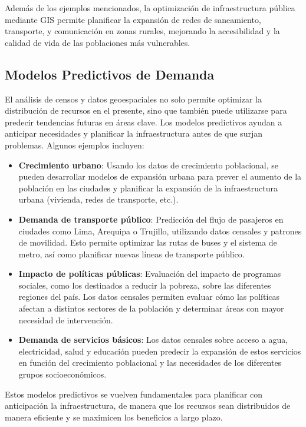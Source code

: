 \documentclass{article}
\begin{document}
{Además de los ejemplos mencionados, la optimización de infraestructura pública mediante GIS permite planificar la expansión de redes de saneamiento, transporte, y comunicación en zonas rurales, mejorando la accesibilidad y la calidad de vida de las poblaciones más vulnerables.

\subsection*{Modelos Predictivos de Demanda}
El análisis de censos y datos geoespaciales no solo permite optimizar la distribución de recursos en el presente, sino que también puede utilizarse para predecir tendencias futuras en áreas clave. Los modelos predictivos ayudan a anticipar necesidades y planificar la infraestructura antes de que surjan problemas. Algunos ejemplos incluyen:

\begin{itemize}
	\item \textbf{Crecimiento urbano}: Usando los datos de crecimiento poblacional, se pueden desarrollar modelos de expansión urbana para prever el aumento de la población en las ciudades y planificar la expansión de la infraestructura urbana (vivienda, redes de transporte, etc.).
	\item \textbf{Demanda de transporte público}: Predicción del flujo de pasajeros en ciudades como Lima, Arequipa o Trujillo, utilizando datos censales y patrones de movilidad. Esto permite optimizar las rutas de buses y el sistema de metro, así como planificar nuevas líneas de transporte público.
	\item \textbf{Impacto de políticas públicas}: Evaluación del impacto de programas sociales, como los destinados a reducir la pobreza, sobre las diferentes regiones del país. Los datos censales permiten evaluar cómo las políticas afectan a distintos sectores de la población y determinar áreas con mayor necesidad de intervención.
	\item \textbf{Demanda de servicios básicos}: Los datos censales sobre acceso a agua, electricidad, salud y educación pueden predecir la expansión de estos servicios en función del crecimiento poblacional y las necesidades de los diferentes grupos socioeconómicos.
\end{itemize}

Estos modelos predictivos se vuelven fundamentales para planificar con anticipación la infraestructura, de manera que los recursos sean distribuidos de manera eficiente y se maximicen los beneficios a largo plazo.

}
\end{document}
